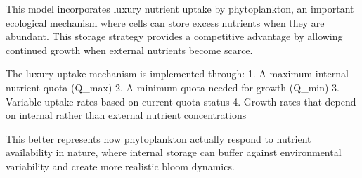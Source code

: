 This model incorporates luxury nutrient uptake by phytoplankton, an important ecological mechanism where cells can store excess nutrients when they are abundant. This storage strategy provides a competitive advantage by allowing continued growth when external nutrients become scarce.

The luxury uptake mechanism is implemented through:
1. A maximum internal nutrient quota (Q_max)
2. A minimum quota needed for growth (Q_min) 
3. Variable uptake rates based on current quota status
4. Growth rates that depend on internal rather than external nutrient concentrations

This better represents how phytoplankton actually respond to nutrient availability in nature, where internal storage can buffer against environmental variability and create more realistic bloom dynamics.

